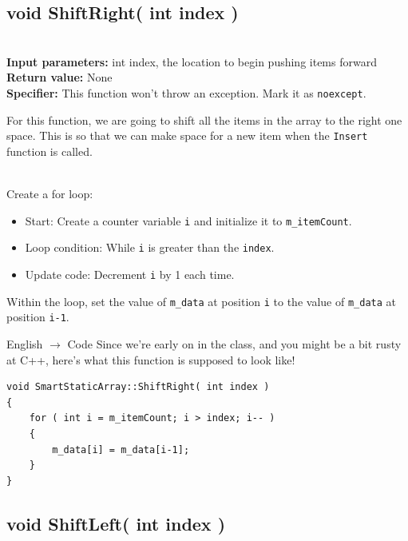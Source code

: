 \documentclass[a4paper,12pt]{book}
\begin{document}
    \hrulefill
    \subsection*{void ShiftRight( int index )}

    \begin{framed} ~\\
        \textbf{Input parameters:} int index, the location to begin pushing items forward \\
        \textbf{Return value:} None \\
        \textbf{Specifier:} This function won't throw an exception. Mark it as \texttt{noexcept}.
    \end{framed}

    For this function, we are going to shift all the items in the array
    to the right one space. This is so that we can make space for a new
    item when the \texttt{Insert} function is called.

    ~\\
    Create a for loop:
    \begin{itemize}
        \item Start: Create a counter variable \texttt{i} and initialize it to
            \texttt{m\_itemCount}.
        \item Loop condition: While \texttt{i} is greater than the \texttt{index}.
        \item Update code: Decrement \texttt{i} by 1 each time.
    \end{itemize}

    Within the loop, set the value of \texttt{m\_data} at position \texttt{i}
    to the value of \texttt{m\_data} at position \texttt{i-1}.

    \begin{hint}{English $\to$ Code}
        Since we're early on in the class, and you might be a bit rusty
        at C++, here's what this function is supposed to look like!

\begin{verbatim}
void SmartStaticArray::ShiftRight( int index )
{
    for ( int i = m_itemCount; i > index; i-- )
    {
        m_data[i] = m_data[i-1];
    }
}
\end{verbatim}
    \end{hint}
    
    \hrulefill
    \subsection*{void ShiftLeft( int index )}
\end{document}
